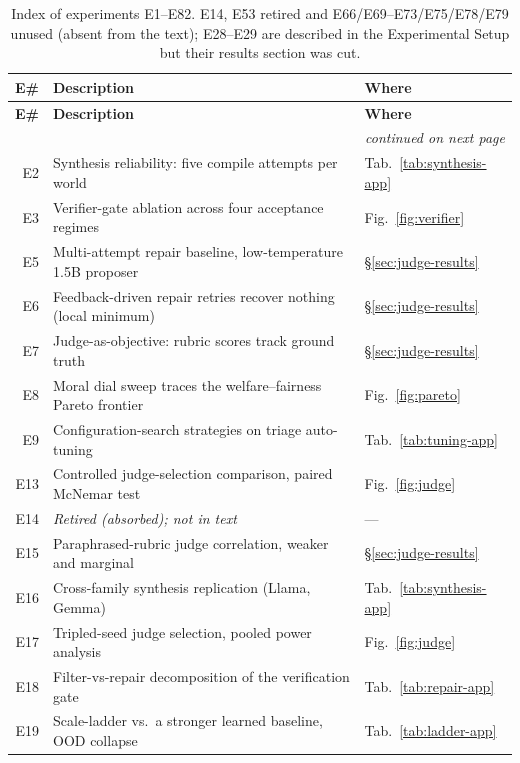 \documentclass[11pt]{article}
\begin{document}
\begingroup\footnotesize\setlength{\tabcolsep}{4pt}
\begin{longtable}{@{}r p{} l@{}}
\caption{Index of experiments E1--E82. E14, E53 retired and E66/E69--E73/E75/E78/E79
unused (absent from the text); E28--E29 are described in the Experimental Setup but
their results section was cut.}\label{tab:experiment-index}\\
\toprule
\textbf{E\#} & \textbf{Description} & \textbf{Where} \\
\midrule
\endfirsthead
\toprule
\textbf{E\#} & \textbf{Description} & \textbf{Where} \\
\midrule
\endhead
\midrule
\multicolumn{3}{r}{\footnotesize\itshape continued on next page}\\
\endfoot
\bottomrule
\endlastfoot
E2 & Synthesis reliability: five compile attempts per world & Tab.~\ref{tab:synthesis-app} \\
E3 & Verifier-gate ablation across four acceptance regimes & Fig.~\ref{fig:verifier} \\
E5 & Multi-attempt repair baseline, low-temperature 1.5B proposer & \S\ref{sec:judge-results} \\
E6 & Feedback-driven repair retries recover nothing (local minimum) & \S\ref{sec:judge-results} \\
E7 & Judge-as-objective: rubric scores track ground truth & \S\ref{sec:judge-results} \\
E8 & Moral dial sweep traces the welfare--fairness Pareto frontier & Fig.~\ref{fig:pareto} \\
E9 & Configuration-search strategies on triage auto-tuning & Tab.~\ref{tab:tuning-app} \\
E13 & Controlled judge-selection comparison, paired McNemar test & Fig.~\ref{fig:judge} \\
E14 & \emph{Retired (absorbed); not in text} & --- \\
E15 & Paraphrased-rubric judge correlation, weaker and marginal & \S\ref{sec:judge-results} \\
E16 & Cross-family synthesis replication (Llama, Gemma) & Tab.~\ref{tab:synthesis-app} \\
E17 & Tripled-seed judge selection, pooled power analysis & Fig.~\ref{fig:judge} \\
E18 & Filter-vs-repair decomposition of the verification gate & Tab.~\ref{tab:repair-app} \\
E19 & Scale-ladder vs.\ a stronger learned baseline, OOD collapse & Tab.~\ref{tab:ladder-app} \\

\end{longtable}
\end{document}
